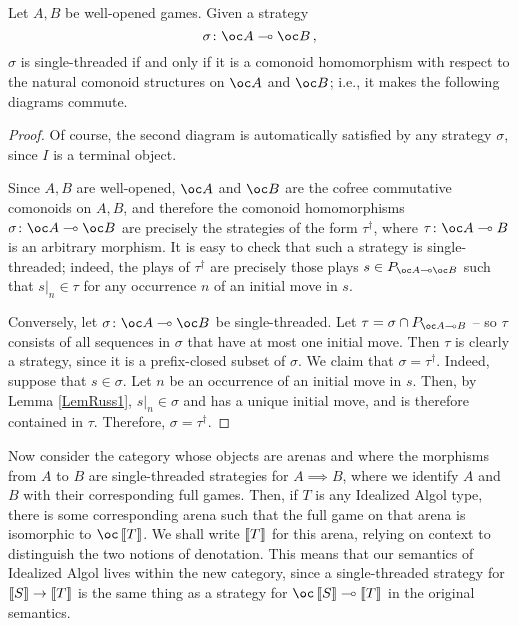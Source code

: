 \begin{proposition}
  Let $A,B$ be well-opened games.
  Given a strategy
  \[
    \sigma\from \oc A \implies \oc B\,,
    \]
  $\sigma$ is single-threaded if and only if it is a comonoid homomorphism with respect to the natural comonoid structures on $\oc A$ and $\oc B$; i.e., it makes the following diagrams commute.
\end{proposition}
\begin{proof}
  Of course, the second diagram is automatically satisfied by any strategy $\sigma$, since $I$ is a terminal object.

  Since $A,B$ are well-opened, $\oc A$ and $\oc B$ are the cofree commutative comonoids on $A,B$, and therefore the comonoid homomorphisms $\sigma\from \oc A \implies \oc B$ are precisely the strategies of the form $\tau^\dag$, where $\tau\from\oc A \implies B$ is an arbitrary morphism.  
  It is easy to check that such a strategy is single-threaded; indeed, the plays of $\tau^\dag$ are precisely those plays $s\in P_{\oc A \implies \oc B}$ such that $s\vert_n\in\tau$ for any occurrence $n$ of an initial move in $s$.  

  Conversely, let $\sigma\from \oc A \implies \oc B$ be single-threaded.  
  Let $\tau=\sigma\cap P_{\oc A \implies B}$ -- so $\tau$ consists of all sequences in $\sigma$ that have at most one initial move.  
  Then $\tau$ is clearly a strategy, since it is a prefix-closed subset of $\sigma$.
  We claim that $\sigma=\tau^\dag$.  
  Indeed, suppose that $s\in\sigma$.  
  Let $n$ be an occurrence of an initial move in $s$.  
  Then, by Lemma \ref{LemRuss1}, $s\vert_n\in\sigma$ and has a unique initial move, and is therefore contained in $\tau$.  
  Therefore, $\sigma=\tau^\dag$.
\end{proof}

Now consider the category whose objects are arenas and where the morphisms from $A$ to $B$ are single-threaded strategies for $A\implies B$, where we identify $A$ and $B$ with their corresponding full games.  
Then, if $T$ is any Idealized Algol type, there is some corresponding arena such that the full game on that arena is isomorphic to $\oc\deno T$.  
We shall write $\left\llbracket T\right\rrbracket$ for this arena, relying on context to distinguish the two notions of denotation.
This means that our semantics of Idealized Algol lives within the new category, since a single-threaded strategy for $\left\llbracket S\right\rrbracket \to \left\llbracket T\right\rrbracket$ is the same thing as a strategy for $\oc \deno S \implies \deno T$ in the original semantics.

